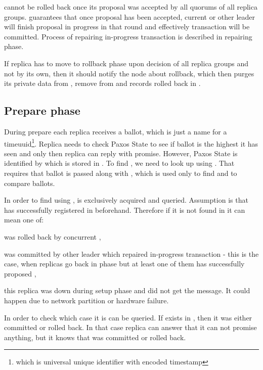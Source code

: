 \transaction cannot be rolled back once its proposal was accepted by all quorums of all replica groups. \paxos guarantees that once proposal has been accepted, current or other leader will finish proposal in progress in that round and effectively transaction will be committed. Process of repairing in-progress transaction is described in repairing phase.

If replica has to move to rollback phase upon decision of all replica groups and not by its own, then it should notify the node about rollback, which then purges its private data from \txStorage, remove \txState from \txIndex and records rolled back \transaction in \txLog.


\subsection{Prepare phase}
During prepare each replica receives a ballot, which is just a name for a timeuuid\footnote{which is universal unique identifier with encoded timestamp}. Replica needs to check Paxos State to see if ballot is the highest it has seen and only then replica can reply with promise. However, Paxos State is identified by \paxosRoundId which is stored in \txIndex. To find \paxosRoundId, we need to look up \txIndex using \txState. That requires that ballot is passed along with \txState, which is used only to find \paxosRoundId and to compare ballots.

In order to find \paxosRoundId using \txState, \txIndex is exclusively acquired and queried. Assumption is that \transaction has successfully registered in \txIndex beforehand. Therefore if it is not found in \txIndex it can mean one of:
\begin{enumerate*}
\item \transaction was rolled back by concurrent \transactionj,
\item \transaction was committed by other leader which repaired in-progress transaction - this is the case, when replicas go back in phase but at least one of them has successfully proposed \txState,
\item this replica was down during setup phase and did not get the message. It could happen due to network partition or hardware failure.
\end{enumerate*}


In order to check which case it is \txLog can be queried. If \txState exists in \txLog, then it was either committed or rolled back. In that case replica can answer that it can not promise anything, but it knows that \transaction was committed or rolled back.

